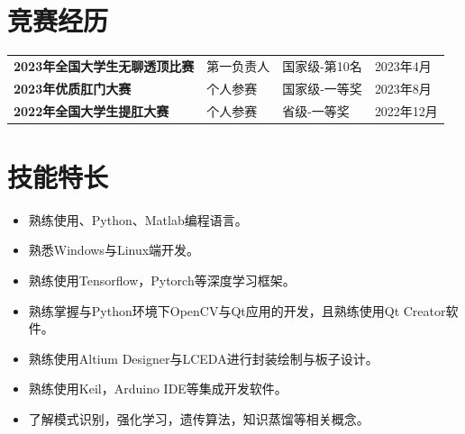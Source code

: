 \documentclass[11pt]{article}
\begin{document}
    \section{\makebox[\widthof{\faTrophy}][c]{\color{NPU_Blue}{\faTrophy}}\quad 竞赛经历}
    \vspace{-1em}
    \begin{table}[h!]
        \begin{tabularx}{\textwidth}{Xp{}p{}p{}}
            \textbf{2023年全国大学生无聊透顶比赛} & 第一负责人 & 国家级-第10名 & 2023年4月 \\
            \textbf{2023年优质肛门大赛} & 个人参赛 & 国家级-一等奖 & 2023年8月\\
            \textbf{2022年全国大学生提肛大赛} & 个人参赛 & 省级-一等奖 & 2022年12月\\
        \end{tabularx}
    \end{table}

    \section{\makebox[\widthof{\faWrench}][c]{\color{NPU_Blue}{\faWrench}}\quad 技能特长}
    \vspace{0.5em}
    \begin{itemize}
        \item 熟练使用\Cpp 、Python、Matlab编程语言。
        \item 熟悉Windows与Linux端开发。
        \item 熟练使用Tensorflow，Pytorch等深度学习框架。
        \item 熟练掌握\Cpp 与Python环境下OpenCV与Qt应用的开发，且熟练使用Qt Creator软件。
        \item 熟练使用Altium Designer与LCEDA进行封装绘制与板子设计。
        \item 熟练使用Keil，Arduino IDE等集成开发软件。
        \item 了解模式识别，强化学习，遗传算法，知识蒸馏等相关概念。
    \end{itemize}
\end{document}
